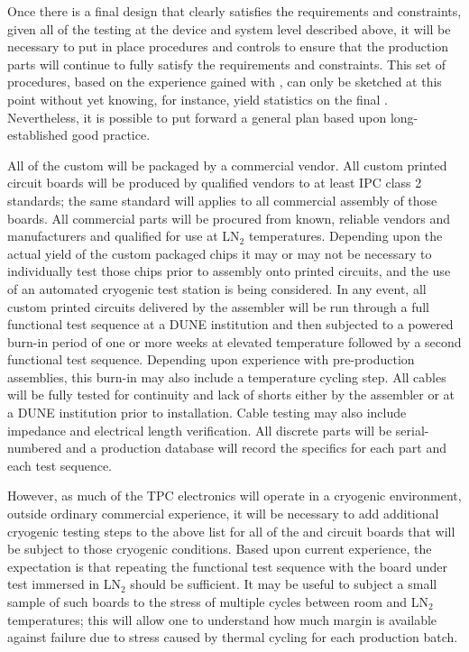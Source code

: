 Once there is a final design that clearly satisfies the requirements and constraints, given all of the testing at the device and system level described above, it will be necessary to put in place procedures and controls to ensure that the production  parts will continue to fully satisfy the requirements and constraints. This set of  procedures, based on the experience gained with , can only be sketched at this point without yet knowing, for instance, yield statistics on the final . Nevertheless, it is possible to put forward a general plan based upon long-established good practice.

All of the custom  will be packaged by a commercial vendor. 
All custom printed circuit boards will be produced by qualified vendors to at least IPC class 2 standards; the same standard will applies to all commercial assembly of those boards. 
All commercial parts will be procured from known, reliable vendors and manufacturers and qualified for use at LN$_2$ temperatures. Depending upon the actual yield of the custom packaged chips it may or may not be necessary to individually test those chips prior to assembly onto printed circuits, and the use of an automated cryogenic test station is being considered. In any event, all custom printed circuits delivered by the assembler will be run through a full functional test sequence at a DUNE institution and then subjected to a powered burn-in period of one or more weeks at elevated temperature followed by a second functional test sequence. Depending upon experience with pre-production assemblies, this burn-in may also include a temperature cycling step. All cables will be fully tested for continuity and lack of shorts either by the assembler or at a DUNE institution prior to installation. Cable testing may also include impedance and electrical length verification. All discrete  parts will be serial-numbered and a production database will record the specifics for each part and each test sequence.

However, as much of the \spmod %
TPC electronics will operate in a cryogenic environment, outside ordinary commercial experience, it will be necessary to add additional cryogenic testing steps to the above list for all of the  and circuit boards that will be subject to those cryogenic conditions. Based upon current experience, the expectation is that repeating the functional test sequence with the board under test immersed in LN$_2$ should be sufficient. It may be useful to subject a small sample of such boards to the stress of multiple cycles between room and LN$_2$ temperatures; this will allow one to understand how much margin is available against failure due to stress caused by thermal cycling for each production batch.

